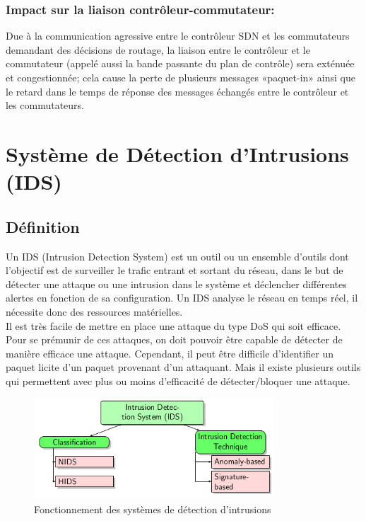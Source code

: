 \subsubsection{Impact sur la liaison contrôleur-commutateur:}
Due à la communication agressive entre le contrôleur SDN et les commutateurs demandant des décisions de routage, la liaison entre le contrôleur et le commutateur (appelé aussi la bande passante du plan de contrôle) sera exténuée et congestionnée; cela cause la perte de plusieurs messages «paquet-in» ainsi que le retard dans le temps de réponse des messages échangés entre le contrôleur et les commutateurs.

\section{Système de Détection d’Intrusions (IDS)}

\subsection{Définition}

Un IDS (Intrusion Detection System) est un outil ou un ensemble d’outils dont l’objectif est de surveiller le trafic entrant et sortant du réseau, dans le but de détecter une attaque ou une intrusion dans le système et déclencher différentes alertes en fonction de sa configuration. Un IDS analyse le réseau en temps réel, il nécessite donc des ressources matérielles.\\

\noindent Il est très facile de mettre en place une attaque du type DoS qui soit efficace. Pour se prémunir de ces attaques, on doit pouvoir être capable de détecter de manière efficace une attaque. Cependant, il peut être difficile d’identifier un paquet licite d’un paquet provenant d’un attaquant. Mais il existe plusieurs outils qui permettent avec plus ou moins d’efficacité de détecter/bloquer une attaque.\\

\begin{figure}[h]
\centering
\includegraphics[width=0.8\textwidth]{Figures/IDS}
\decoRule
\caption{Fonctionnement des systèmes de détection d’intrusions}
\label{fig:IDS_Architecture}
\end{figure} 

